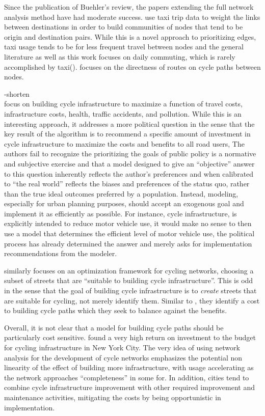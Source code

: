 Since the publication of Buehler's review, the papers extending the full network analysis method have had moderate success. \cite{akbarzadeh2018designing} use taxi trip data to weight the links between destinations in order to build communities of nodes that tend to be origin and destination pairs. While this is a novel approach to prioritizing edges, taxi usage tends to be for less frequent travel between nodes and the general literature as well as this work focuses on daily commuting, which is rarely accomplished by taxi(\cite{jtw}). \cite{boisjoly2019bicycle} focuses on the directness of routes on cycle paths between nodes. 

-shorten \\
\cite{doorley2019designing} focus on building cycle infrastructure to maximize a function of travel costs, infrastructure costs, health, traffic accidents, and pollution. While this is an interesting approach, it addresses a more political question in the sense that the key result of the algorithm is to recommend a specific amount of investment in cycle infrastructure to maximize the costs and benefits to all road users, The authors fail to recognize the prioritizing the goals of public policy is a normative and subjective exercise and that a model designed to give an ``objective'' answer to this question inherently reflects the author's preferences and when calibrated to ``the real world'' reflects the biases and preferences of the status quo, rather than the true ideal outcomes preferred by a population. Instead, modeling, especially for urban planning purposes, should accept an exogenous goal and implement it as efficiently as possible. For instance, cycle infrastructure, is explicitly intended to reduce motor vehicle use, it would make no sense to then use a model that determines the efficient level of motor vehicle use, the political process has already determined the answer and merely asks for implementation recommendations from the modeler. 

\cite{mauttone2017bicycle} similarly focuses on an optimization framework for cycling networks, choosing a subset of streets that are ``suitable to building cycle infrastructure''. This is odd in the sense that the goal of building cycle infrastructure is to \textit{create} streets that are suitable for cycling, not merely identify them. Similar to \cite{doorley2019designing}, they identify a cost to building cycle paths which they seek to balance against the benefits. 

Overall, it is not clear that a model for building cycle paths should be particularly cost sensitive. \cite{gu2017cost} found a very high return on investment to the budget for cycling infrastructure in New York City. The very idea of using network analysis for the development of cycle networks emphasizes the potential non linearity of the effect of building more infrastructure, with usage accelerating as the network approaches ``completeness'' in some for. In addition, cities tend to combine cycle infrastructure improvement with other required improvement and maintenance activities, mitigating the costs by being opportunistic in implementation. 

